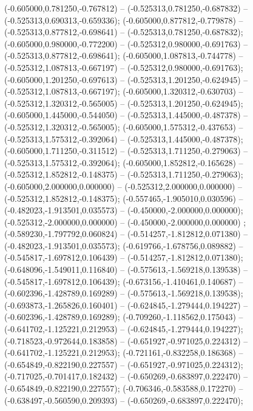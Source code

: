  (-0.605000,0.781250,-0.767812) -- (-0.525313,0.781250,-0.687832) -- (-0.525313,0.690313,-0.659336);
 (-0.605000,0.877812,-0.779878) -- (-0.525313,0.877812,-0.698641) -- (-0.525313,0.781250,-0.687832);
 (-0.605000,0.980000,-0.772200) -- (-0.525312,0.980000,-0.691763) -- (-0.525313,0.877812,-0.698641);
 (-0.605000,1.087813,-0.744778) -- (-0.525312,1.087813,-0.667197) -- (-0.525312,0.980000,-0.691763);
 (-0.605000,1.201250,-0.697613) -- (-0.525313,1.201250,-0.624945) -- (-0.525312,1.087813,-0.667197);
 (-0.605000,1.320312,-0.630703) -- (-0.525312,1.320312,-0.565005) -- (-0.525313,1.201250,-0.624945);
 (-0.605000,1.445000,-0.544050) -- (-0.525313,1.445000,-0.487378) -- (-0.525312,1.320312,-0.565005);
 (-0.605000,1.575312,-0.437653) -- (-0.525313,1.575312,-0.392064) -- (-0.525313,1.445000,-0.487378);
 (-0.605000,1.711250,-0.311512) -- (-0.525313,1.711250,-0.279063) -- (-0.525313,1.575312,-0.392064);
 (-0.605000,1.852812,-0.165628) -- (-0.525312,1.852812,-0.148375) -- (-0.525313,1.711250,-0.279063);
 (-0.605000,2.000000,0.000000) -- (-0.525312,2.000000,0.000000) -- (-0.525312,1.852812,-0.148375);
 (-0.557465,-1.905010,0.030596) -- (-0.482023,-1.913501,0.035573) -- (-0.450000,-2.000000,0.000000);
 (-0.525312,-2.000000,0.000000) -- (-0.450000,-2.000000,0.000000) ;
 (-0.589230,-1.797792,0.060824) -- (-0.514257,-1.812812,0.071380) -- (-0.482023,-1.913501,0.035573);
 (-0.619766,-1.678756,0.089882) -- (-0.545817,-1.697812,0.106439) -- (-0.514257,-1.812812,0.071380);
 (-0.648096,-1.549011,0.116840) -- (-0.575613,-1.569218,0.139538) -- (-0.545817,-1.697812,0.106439);
 (-0.673156,-1.410461,0.140687) -- (-0.602396,-1.428789,0.169289) -- (-0.575613,-1.569218,0.139538);
 (-0.693873,-1.265826,0.160401) -- (-0.624845,-1.279444,0.194227) -- (-0.602396,-1.428789,0.169289);
 (-0.709260,-1.118562,0.175043) -- (-0.641702,-1.125221,0.212953) -- (-0.624845,-1.279444,0.194227);
 (-0.718523,-0.972644,0.183858) -- (-0.651927,-0.971025,0.224312) -- (-0.641702,-1.125221,0.212953);
 (-0.721161,-0.832258,0.186368) -- (-0.654849,-0.822190,0.227557) -- (-0.651927,-0.971025,0.224312);
 (-0.717025,-0.701417,0.182432) -- (-0.650269,-0.683897,0.222470) -- (-0.654849,-0.822190,0.227557);
 (-0.706346,-0.583588,0.172270) -- (-0.638497,-0.560590,0.209393) -- (-0.650269,-0.683897,0.222470);
